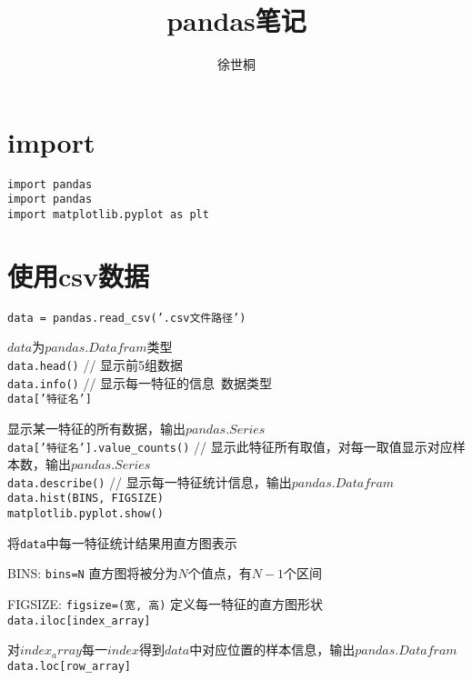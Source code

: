 \documentclass[UTF8]{ctexart}
\title{pandas笔记}
\author{徐世桐}
\date{}
\begin{document}
\maketitle

\section{import}
\noindent \texttt{import pandas}\\
\texttt{import pandas}\\
\texttt{import matplotlib.pyplot as plt}

\section{使用csv数据}
\texttt{data = pandas.read\_csv('.csv文件路径')}

  $data$为$pandas.Datafram$类型\\
\texttt{data.head()} // 显示前5组数据\\
\texttt{data.info()} // 显示每一特征的信息\ 数据类型\\
\texttt{data['特征名']} 
  
  显示某一特征的所有数据，输出$pandas.Series$\\
\texttt{data['特征名'].value\_counts()} // 显示此特征所有取值，对每一取值显示对应样本数，输出$pandas.Series$\\
\texttt{data.describe()} // 显示每一特征统计信息，输出$pandas.Datafram$\\
\texttt{data.hist(BINS, FIGSIZE)}\\
\texttt{matplotlib.pyplot.show()}

  将\texttt{data}中每一特征统计结果用直方图表示

  BINS: \texttt{bins=N} 直方图将被分为$N$个值点，有$N-1$个区间

  FIGSIZE: \texttt{figsize=(宽, 高)} 定义每一特征的直方图形状\\
\texttt{data.iloc[index\_array]}

  对$index_array$每一$index$得到$data$中对应位置的样本信息，输出$pandas.Datafram$\\
\texttt{data.loc[row\_array]}
\end{document}
